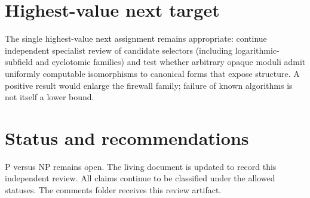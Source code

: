 \documentclass[11pt]{article}
\begin{document}
\section{Highest-value next target}
The single highest-value next assignment remains appropriate: continue independent specialist review of candidate selectors (including logarithmic-subfield and cyclotomic families) and test whether arbitrary opaque moduli admit uniformly computable isomorphisms to canonical forms that expose structure. A positive result would enlarge the firewall family; failure of known algorithms is not itself a lower bound.

\section{Status and recommendations}
P versus NP remains open. The living document is updated to record this independent review. All claims continue to be classified under the allowed statuses. The comments folder receives this review artifact.

\end{document}
